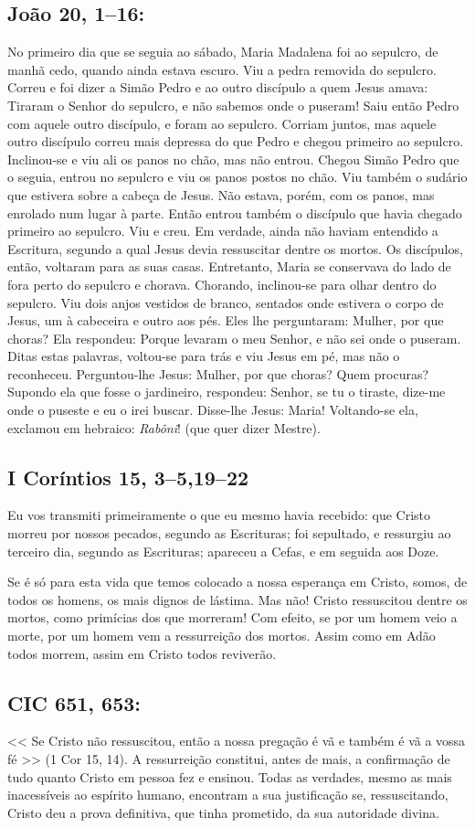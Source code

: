 \documentclass[10pt,a5paper]{book}
\newcommand{\from}[1]{\subsection*{#1}}
\begin{document}
\from{João 20, 1--16:}

No primeiro dia que se seguia ao sábado, Maria Madalena foi ao sepulcro, de manhã cedo, quando ainda estava escuro. Viu a pedra removida do sepulcro.
Correu e foi dizer a Simão Pedro e ao outro discípulo a quem Jesus amava:
Tiraram o Senhor do sepulcro, e não sabemos onde o puseram!
Saiu então Pedro com aquele outro discípulo, e foram ao sepulcro.
Corriam juntos, mas aquele outro discípulo correu mais depressa do que Pedro e chegou primeiro ao sepulcro.
Inclinou-se e viu ali os panos no chão, mas não entrou.
Chegou Simão Pedro que o seguia, entrou no sepulcro e viu os panos postos no chão.
Viu também o sudário que estivera sobre a cabeça de Jesus. Não estava, porém, com os panos, mas enrolado num lugar à parte.
Então entrou também o discípulo que havia chegado primeiro ao sepulcro. Viu e creu.
Em verdade, ainda não haviam entendido a Escritura, segundo a qual Jesus devia ressuscitar dentre os mortos.
Os discípulos, então, voltaram para as suas casas.
Entretanto, Maria se conservava do lado de fora perto do sepulcro e chorava. Chorando, inclinou-se para olhar dentro do sepulcro.
Viu dois anjos vestidos de branco, sentados onde estivera o corpo de Jesus, um à cabeceira e outro aos pés.
Eles lhe perguntaram: Mulher, por que choras?
Ela respondeu: Porque levaram o meu Senhor, e não sei onde o puseram.
Ditas estas palavras, voltou-se para trás e viu Jesus em pé, mas não o reconheceu.
Perguntou-lhe Jesus: Mulher, por que choras? Quem procuras? Supondo ela que fosse o jardineiro, respondeu: Senhor, se tu o tiraste, dize-me onde o puseste e eu o irei buscar.
Disse-lhe Jesus: Maria!
Voltando-se ela, exclamou em hebraico: \emph{Rabôni}! (que quer dizer Mestre).

\from{I Coríntios 15, 3--5,19--22}

Eu vos transmiti primeiramente o que eu mesmo havia recebido:
que Cristo morreu por nossos pecados, segundo as Escrituras;
foi sepultado, e ressurgiu ao terceiro dia, segundo as Escrituras;
apareceu a Cefas, e em seguida aos Doze.

Se é só para esta vida que temos colocado a nossa esperança em Cristo, somos, de todos os homens, os mais dignos de lástima.
Mas não! Cristo ressuscitou dentre os mortos, como primícias dos que morreram!
Com efeito, se por um homem veio a morte, por um homem vem a ressurreição dos mortos.
Assim como em Adão todos morrem, assim em Cristo todos reviverão.

\from{CIC 651, 653:}

<< Se Cristo não ressuscitou, então a nossa pregação é vã e também é vã a vossa fé >> (1 Cor 15, 14).
A ressurreição constitui, antes de mais, a confirmação de tudo quanto Cristo em pessoa fez e ensinou.
Todas as verdades, mesmo as mais inacessíveis ao espírito humano, encontram a sua justificação se, ressuscitando, Cristo deu a prova definitiva, que tinha prometido, da sua autoridade divina.
\end{document}
